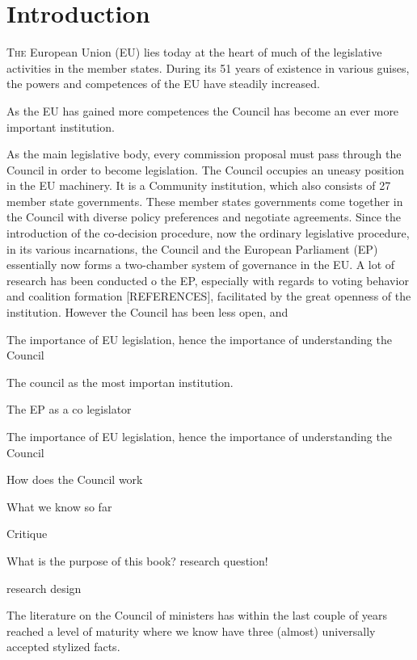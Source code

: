 \chapter{Introduction}

\lettrine[lines = 3]{T}{he} European Union (EU) lies today at the heart of much of the legislative activities in the member states. During its 51 years of existence in  various guises, the powers and competences of the EU have steadily increased.



As the EU has gained more competences the Council has become an ever more important institution. 



As the main legislative body, every commission proposal must pass through the Council in order to become legislation. The Council occupies an uneasy position in the EU machinery. It is a Community institution, which also consists of 27 member state governments. These member states governments come together in the Council with diverse policy preferences and negotiate agreements. Since the introduction of the co-decision procedure, now the ordinary legislative procedure, in its various incarnations, the Council and the European Parliament (EP) essentially now forms a two-chamber system of governance in the EU. A lot of research has been conducted o the EP, especially with regards to voting behavior and coalition formation [REFERENCES], facilitated by the great openness of the institution. However the Council has been less open, and  


The importance of EU legislation, hence the importance of understanding the Council


The council as the most importan institution.

The EP as a co legislator

The importance of EU legislation, hence the importance of understanding the Council

How does the Council work

What we know so far

Critique

What is the purpose of this book? research question!

research design




The literature on the Council of ministers has within the last couple of years reached a level of maturity where we know have three (almost) universally accepted stylized facts.

